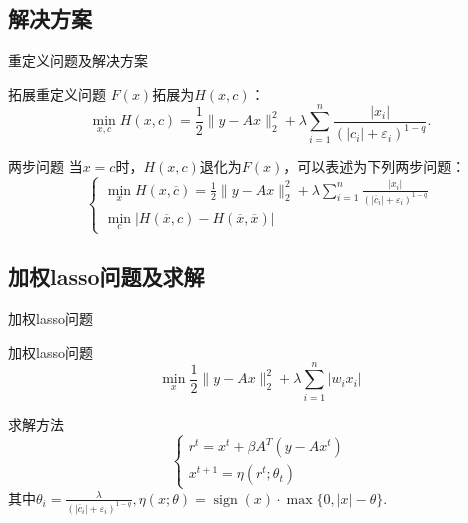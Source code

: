 \documentclass[compress]{beamer}%
\begin{document}
\subsection{解决方案}
\begin{frame}{重定义问题及解决方案}
	\begin{block}{拓展重定义问题}
		${F ( x )}$拓展为$H ( x , c )$：
$$\operatorname { min } _ { x , c } H ( x , c ) = \frac { 1 } { 2 } \| y - A x \| _ { 2 } ^ { 2 } + \lambda \sum _ { i = 1 } ^ { n } \frac { | x _ { i } | } { ( | c _ { i } | + \varepsilon _ { i } ) ^ { 1 - q } } .$$
	\end{block}
	\begin{block}{两步问题}
		当$x=c$时，$H ( x , c )$退化为${F ( x )}$，可以表述为下列两步问题：
$$\left\{ \begin{array} { l } { \operatorname { min } _ { x } H ( x , \overline { c } ) = \frac { 1 } { 2 } \| y - A x \| _ { 2 } ^ { 2 } + \lambda \sum _ { i = 1 } ^ { n } \frac { | x _ { i } | } { ( | \overline { c } _ { i } | + \varepsilon _ { i } ) ^ { 1 - q } } } \\ { \operatorname { min } _ { c } | H ( \overline { x } , c ) - H ( \overline { x } , \overline { x } ) | } \end{array} \right.$$
	\end{block}
\end{frame}
\subsection{加权lasso问题及求解}
\begin{frame}{加权lasso问题}
	\begin{block}{加权lasso问题}
$$\operatorname { min } _ { x } \frac { 1 } { 2 } \| y - A x \| _ { 2 } ^ { 2 } + \lambda \sum _ { i = 1 } ^ { n } | w _ { i } x _ { i } |$$
\end{block}
	\begin{block}{求解方法}
		$$\left\{ \begin{array}{l}{ r ^ { t } = x ^ { t } + \beta A ^ { T } ( y - A x ^ { t } ) }\\{ x ^ { t + 1 } = \eta ( r ^ { t } ; \theta_t ) }\end{array} \right.$$
		其中$\theta _ { i } = \frac { \lambda } { ( | \overline { c } _ { i } | + \varepsilon _ { i } ) ^ { 1 - q } } ,$$\eta ( x ; \theta ) = \operatorname { sign } ( x ) \cdot \operatorname { max } \{ 0 , | x | - \theta \} .$
	\end{block}
\end{frame}
\end{document}
